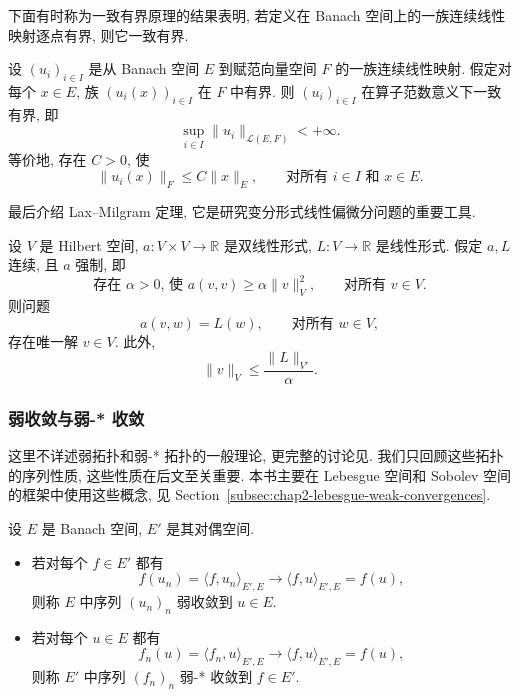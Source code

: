下面有时称为一致有界原理的结果表明, 若定义在 Banach 空间上的一族连续线性映射逐点有界, 则它一致有界.

\begin{Theorem}
\label{thm:chap2-banach-steinhaus}
设 $(u_i)_{i\in I}$ 是从 Banach 空间 $E$ 到赋范向量空间 $F$ 的一族连续线性映射. 假定对每个 $x\in E$, 族 $(u_i(x))_{i\in I}$ 在 $F$ 中有界. 则 $(u_i)_{i\in I}$ 在算子范数意义下一致有界, 即
\[
  \sup_{i\in I}\|u_i\|_{\mathcal{L}(E,F)}<+\infty.
\]
等价地, 存在 $C>0$, 使
\[
  \|u_i(x)\|_F\leq C\|x\|_E,
  \qquad\text{对所有 $i\in I$ 和 $x\in E$}.
\]
\end{Theorem}

最后介绍 Lax--Milgram 定理, 它是研究变分形式线性偏微分问题的重要工具.

\begin{Theorem}
\label{thm:chap2-lax-milgram}
设 $V$ 是 Hilbert 空间, $a:V\times V\to\mathbb{R}$ 是双线性形式, $L:V\to\mathbb{R}$ 是线性形式. 假定 $a,L$ 连续, 且 $a$ 强制, 即
\[
  \text{存在 $\alpha>0$, 使 }a(v,v)\geq\alpha\|v\|_V^2,
  \qquad\text{对所有 $v\in V$}.
\]
则问题
\begin{equation}
\label{eq:chap2-lax-milgram-problem}
  a(v,w)=L(w),\qquad\text{对所有 $w\in V$},
\end{equation}
存在唯一解 $v\in V$. 此外,
\begin{equation}
\label{eq:chap2-lax-milgram-estimate}
  \|v\|_V\leq\frac{\|L\|_{V'}}{\alpha}.
\end{equation}
\end{Theorem}

\subsubsection{弱收敛与弱-* 收敛}
\label{subsec:chap2-weak-convergences}

这里不详述弱拓扑和弱-* 拓扑的一般理论, 更完整的讨论见. 我们只回顾这些拓扑的序列性质, 这些性质在后文至关重要. 本书主要在 Lebesgue 空间和 Sobolev 空间的框架中使用这些概念, 见 Section~\ref{subsec:chap2-lebesgue-weak-convergences}.

\begin{Definition}
\label{def:chap2-weak-convergence}
设 $E$ 是 Banach 空间, $E'$ 是其对偶空间.
\begin{itemize}
\item 若对每个 $f\in E'$ 都有
\[
  f(u_n)=\langle f,u_n\rangle_{E',E}\longrightarrow
  \langle f,u\rangle_{E',E}=f(u),
\]
则称 $E$ 中序列 $(u_n)_n$ 弱收敛到 $u\in E$.
\item 若对每个 $u\in E$ 都有
\[
  f_n(u)=\langle f_n,u\rangle_{E',E}\longrightarrow
  \langle f,u\rangle_{E',E}=f(u),
\]
则称 $E'$ 中序列 $(f_n)_n$ 弱-* 收敛到 $f\in E'$.
\end{itemize}
\end{Definition}

